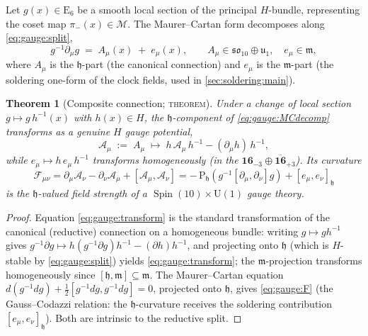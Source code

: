 \documentclass[11pt]{article}
\theoremstyle{plain}
\newtheorem{theorem}{Theorem}[section]
\theoremstyle{definition}
\theoremstyle{remark}
\newcommand{\U}[1]{\mathrm{U}(#1)}
\newcommand{\E}[1]{\mathrm{E}_{#1}}
\newcommand{\Spin}{\operatorname{Spin}}
\newcommand{\Uone}{\U{1}}
\newcommand{\ESix}{\E{6}}
\begin{document}
Let $g(x)\in\ESix$ be a smooth local section of the principal $H$-bundle,
representing the coset map $\pi_-(x)\in\mathcal M$. The Maurer--Cartan
form decomposes along \eqref{eq:gauge:split},
\begin{equation}\label{eq:gauge:MCdecomp}
  g^{-1}\partial_\mu g
  \;=\;
  A_\mu(x) \;+\; e_\mu(x),
  \qquad
  A_\mu\in\mathfrak{so}_{10}\oplus\mathfrak u_{1},
  \quad
  e_\mu\in\mathfrak m,
\end{equation}
where $A_\mu$ is the $\mathfrak h$-part (the canonical connection) and
$e_\mu$ is the $\mathfrak m$-part (the soldering one-form of the clock
fields, used in \autoref{sec:soldering:main}).

\begin{theorem}[Composite connection; \textsc{theorem}]\label{thm:gauge:composite}
Under a change of local section $g\mapsto g\,h^{-1}(x)$ with
$h(x)\in H$, the $\mathfrak h$-component of \eqref{eq:gauge:MCdecomp}
transforms as a genuine $H$ gauge potential,
\begin{equation}\label{eq:gauge:transform}
  \mathcal A_\mu \;:=\; A_\mu
  \;\longmapsto\;
  h\,\mathcal A_\mu\,h^{-1} - (\partial_\mu h)\,h^{-1},
\end{equation}
while $e_\mu\mapsto h\,e_\mu\,h^{-1}$ transforms homogeneously (in the
$\mathbf{16}_{-3}\oplus\overline{\mathbf{16}}_{+3}$). Its curvature
\begin{equation}\label{eq:gauge:F}
  \mathcal F_{\mu\nu}
  =\partial_\mu\mathcal A_\nu-\partial_\nu\mathcal A_\mu
   +[\mathcal A_\mu,\mathcal A_\nu]
  = -\,\mathrm P_{\mathfrak h}\!\left(g^{-1}[\partial_\mu,\partial_\nu]g\right)
    + [e_\mu,e_\nu]_{\mathfrak h}
\end{equation}
is the $\mathfrak h$-valued field strength of a $\Spin(10)\times\Uone$
gauge theory.
\end{theorem}

\begin{proof}
Equation \eqref{eq:gauge:transform} is the standard transformation of the
canonical (reductive) connection on a homogeneous bundle: writing
$g\mapsto gh^{-1}$ gives
$g^{-1}\partial g\mapsto h(g^{-1}\partial g)h^{-1}-(\partial h)h^{-1}$,
and projecting onto $\mathfrak h$ (which is $H$-stable by
\eqref{eq:gauge:split}) yields \eqref{eq:gauge:transform}; the
$\mathfrak m$-projection transforms homogeneously since
$[\mathfrak h,\mathfrak m]\subseteq\mathfrak m$. The Maurer--Cartan
equation $d(g^{-1}dg)+\tfrac12[g^{-1}dg,g^{-1}dg]=0$, projected onto
$\mathfrak h$, gives \eqref{eq:gauge:F} (the Gauss--Codazzi relation:
the $\mathfrak h$-curvature receives the soldering contribution
$[e_\mu,e_\nu]_{\mathfrak h}$). Both are intrinsic to the reductive split.
\end{proof}
\end{document}
